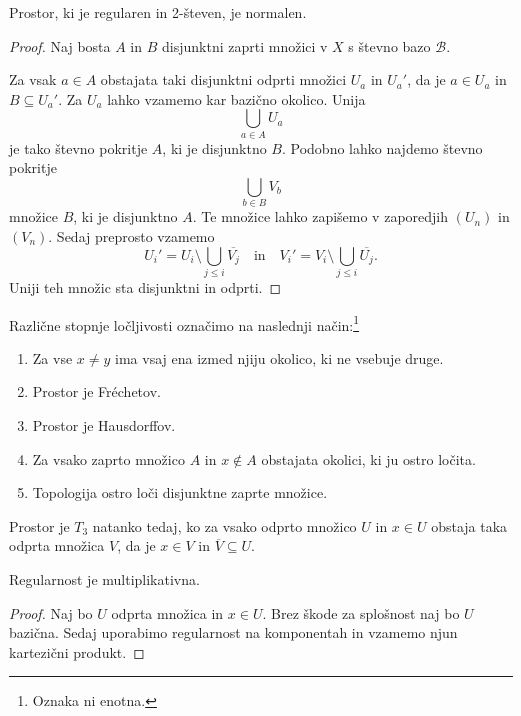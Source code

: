 \obvs

\begin{izrek}
Prostor, ki je regularen in 2-števen, je normalen.
\end{izrek}

\begin{proof}
Naj bosta $A$ in $B$ disjunktni zaprti množici v $X$ s števno bazo
$\mathcal{B}$.

Za vsak $a \in A$ obstajata taki disjunktni odprti množici $U_a$ in
$U_a'$, da je $a \in U_a$ in $B \subseteq U_a'$. Za $U_a$ lahko
vzamemo kar bazično okolico. Unija
\[
\bigcup_{a \in A} U_a
\]
je tako števno pokritje $A$, ki je disjunktno $B$. Podobno lahko
najdemo števno pokritje
\[
\bigcup_{b \in B} V_b
\]
množice $B$, ki je disjunktno $A$. Te množice lahko zapišemo v
zaporedjih $(U_n)$ in $(V_n)$. Sedaj preprosto vzamemo
\[
U_i' = U_i \setminus \bigcup_{j \leq i} \overline{V_j}
\quad \text{in} \quad
V_i' = V_i \setminus \bigcup_{j \leq i} \overline{U_j}.
\]
Uniji teh množic sta disjunktni in odprti.
\end{proof}

\begin{definicija}
Različne stopnje ločljivosti označimo na naslednji način:\footnote{
Oznaka ni enotna.}

\begin{enumerate}[label=$T_{\arabic*}$:, start=0]
\item Za vse $x \ne y$ ima vsaj ena izmed njiju okolico, ki ne
vsebuje druge.
\item Prostor je Fréchetov.
\item Prostor je Hausdorffov.
\item Za vsako zaprto množico $A$ in $x \not \in A$ obstajata
okolici, ki ju ostro ločita.
\item Topologija ostro loči disjunktne zaprte množice.
\end{enumerate}
\end{definicija}

\begin{trditev}
Prostor je $T_3$ natanko tedaj, ko za vsako odprto množico $U$ in
$x \in U$ obstaja taka odprta množica $V$, da je $x \in V$ in
$\overline{V} \subseteq U$.
\end{trditev}

\obvs

\begin{trditev}
Regularnost je multiplikativna.
\end{trditev}

\begin{proof}
Naj bo $U$ odprta množica in $x \in U$. Brez škode za splošnost
naj bo $U$ bazična. Sedaj uporabimo regularnost na komponentah in
vzamemo njun kartezični produkt.
\end{proof}

